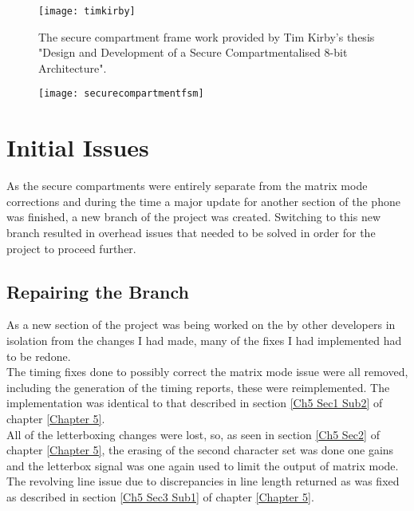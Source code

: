\begin{figure}
  \centering
  \texttt{[image: timkirby]}
  \caption{The secure compartment frame work provided by Tim Kirby's thesis "Design and Development of a Secure Compartmentalised 8-bit Architecture".}
  \label{fig:timkirby}
\end{figure}

\begin{figure}
  \centering
  \texttt{[image: securecompartmentfsm]}
  \caption{}
  \label{fig:securecompartmentfsm}
\end{figure}


\section{Initial Issues}

\label{Ch6 Sec2}

As the secure compartments were entirely separate from the matrix mode corrections and during the time a major update for another section of the phone was finished, a new branch of the project was created. Switching to this new branch resulted in overhead issues that needed to be solved in order for the project to proceed further.

\subsection{Repairing the Branch}

\label{Ch6 Sec2 Sub1}

As a new section of the project was being worked on the by other developers in isolation from the changes I had made, many of the fixes I had implemented had to be redone.\\
The timing fixes done to possibly correct the matrix mode issue were all removed, including the generation of the timing reports, these were reimplemented. The implementation was identical to that described in section \ref{Ch5 Sec1 Sub2} of chapter \ref{Chapter 5}.\\
All of the letterboxing changes were lost, so, as seen in section \ref{Ch5 Sec2} of chapter \ref{Chapter 5}, the erasing of the second character set was done one gains and the letterbox signal was one again used to limit the output of matrix mode.\\
The revolving line issue due to discrepancies in line length returned as was fixed as described in section \ref{Ch5 Sec3 Sub1} of chapter \ref{Chapter 5}.\\

